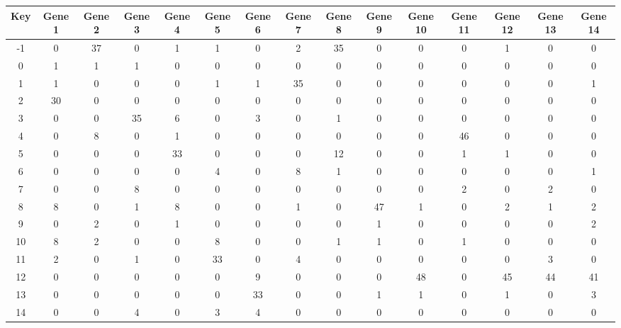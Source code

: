 \begin{tabular}{|c|c|c|c|c|c|c|c|c|c|c|c|c|c|c|}
\hline
Key & Gene 1 & Gene 2 & Gene 3 & Gene 4 & Gene 5 & Gene 6 & Gene 7 & Gene 8 & Gene 9 & Gene 10 & Gene 11 & Gene 12 & Gene 13 & Gene 14 \\
\hline
-1 & 0 & 37 & 0 & 1 & 1 & 0 & 2 & 35 & 0 & 0 & 0 & 1 & 0 & 0 \\
0 & 1 & 1 & 1 & 0 & 0 & 0 & 0 & 0 & 0 & 0 & 0 & 0 & 0 & 0 \\
1 & 1 & 0 & 0 & 0 & 1 & 1 & 35 & 0 & 0 & 0 & 0 & 0 & 0 & 1 \\
2 & 30 & 0 & 0 & 0 & 0 & 0 & 0 & 0 & 0 & 0 & 0 & 0 & 0 & 0 \\
3 & 0 & 0 & 35 & 6 & 0 & 3 & 0 & 1 & 0 & 0 & 0 & 0 & 0 & 0 \\
4 & 0 & 8 & 0 & 1 & 0 & 0 & 0 & 0 & 0 & 0 & 46 & 0 & 0 & 0 \\
5 & 0 & 0 & 0 & 33 & 0 & 0 & 0 & 12 & 0 & 0 & 1 & 1 & 0 & 0 \\
6 & 0 & 0 & 0 & 0 & 4 & 0 & 8 & 1 & 0 & 0 & 0 & 0 & 0 & 1 \\
7 & 0 & 0 & 8 & 0 & 0 & 0 & 0 & 0 & 0 & 0 & 2 & 0 & 2 & 0 \\
8 & 8 & 0 & 1 & 8 & 0 & 0 & 1 & 0 & 47 & 1 & 0 & 2 & 1 & 2 \\
9 & 0 & 2 & 0 & 1 & 0 & 0 & 0 & 0 & 1 & 0 & 0 & 0 & 0 & 2 \\
10 & 8 & 2 & 0 & 0 & 8 & 0 & 0 & 1 & 1 & 0 & 1 & 0 & 0 & 0 \\
11 & 2 & 0 & 1 & 0 & 33 & 0 & 4 & 0 & 0 & 0 & 0 & 0 & 3 & 0 \\
12 & 0 & 0 & 0 & 0 & 0 & 9 & 0 & 0 & 0 & 48 & 0 & 45 & 44 & 41 \\
13 & 0 & 0 & 0 & 0 & 0 & 33 & 0 & 0 & 1 & 1 & 0 & 1 & 0 & 3 \\
14 & 0 & 0 & 4 & 0 & 3 & 4 & 0 & 0 & 0 & 0 & 0 & 0 & 0 & 0 \\
\hline
\end{tabular}